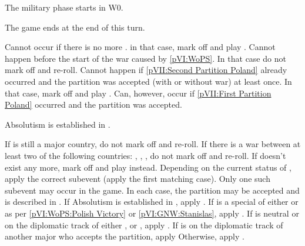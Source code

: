 \phmil
\aparag The military phase starts in W0.

\phpaix
\aparag The game ends at the end of this turn.





\condition{}
\aparag Cannot occur if there is no more \payspologne. in that case, mark off
and play \RD.
\aparag Cannot happen before the start of the war caused by \ref{pVI:WoPS}. In
that case do not mark off and re-roll.
\aparag Cannot happen if \ref{pVII:Second Partition Poland} already occurred
and the partition was accepted (with or without war) at least once. In that
case, mark off and play \RD.
\bparag Can, however, occur if \ref{pVII:First Partition Poland} occurred and
the partition was accepted.

\phevnt
\aparag Absolutism is established in \payspologne.





\condition{}
\aparag If \POL is still a major country, do not mark off and re-roll.
\aparag If there is a war between at least two of the following countries:
\RUS, \AUS, \PRU, do not mark off and re-roll.
\aparag If \payspologne doesn't exist any more, mark off and play \RD instead.
\aparag Depending on the current status of \payspologne, apply the correct
subevent (apply the first matching case). Only one such subevent may occur in
the game. In each case, the partition may be accepted and is described in
.
\bparag If Absolutism is established in \payspologne, apply
.
\aparag If \payspologne is a special \EG of either \FRA or \SUE as per
\ref{pVI:WoPS:Polish Victory} or \ref{pVI:GNW:Stanislas}, apply
.
\bparag If \payspologne is neutral or on the diplomatic track of either \RUS,
\AUS or \PRU, apply .
\bparag If \payspologne is on the diplomatic track of another major who
accepts the partition, apply 
\bparag Otherwise, apply .


